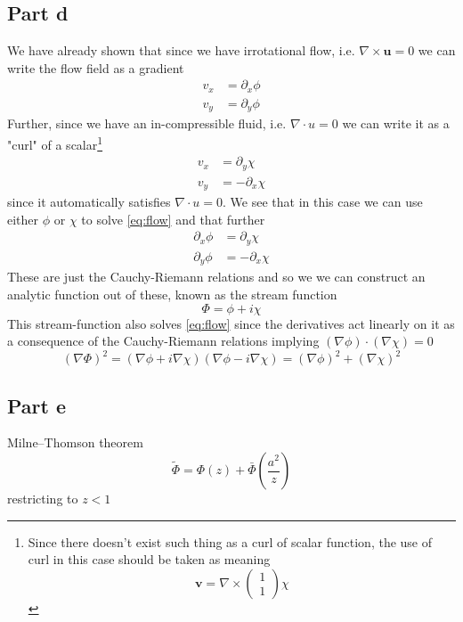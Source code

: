 \documentclass[a4paper,12pt]{article}
\begin{document}
\subsection*{Part d}
We have already shown that since we have irrotational flow, i.e. $\nabla\times \bm u=0$ we can write the flow field as a gradient
\begin{equation}
\begin{aligned}
	v_x&=\partial_x \phi\\
	v_y&=\partial_y \phi
\end{aligned}
\end{equation}
Further, since we have an in-compressible fluid, i.e. $\nabla\cdot u=0$ we can write it as a "curl" of a scalar\footnote{Since there doesn't exist such thing as a curl of scalar function, the use of curl in this case should be taken as meaning \begin{equation}
\bm v=\nabla\times \begin{pmatrix}
1\\1
\end{pmatrix}\chi
\end{equation}}
\begin{equation}
\begin{aligned}
v_x&=\partial_y \chi\\
v_y&=-\partial_x \chi
\end{aligned}
\end{equation}
since it automatically satisfies $\nabla\cdot u=0$. We see that in this case we can use either $\phi$ or $\chi$ to solve \eqref{eq:flow} and that further
\begin{equation}
	\begin{aligned}
		\partial_x \phi&=\partial_y \chi\\
		\partial_y \phi&=-\partial_x \chi
	\end{aligned}
\end{equation}
These are just the Cauchy-Riemann relations and so we we can construct an analytic function out of these, known as the stream function
\begin{equation}
\Phi=\phi+i\chi
\end{equation}
This stream-function also solves \eqref{eq:flow} since the derivatives act linearly on it as a consequence of the Cauchy-Riemann relations implying $(\nabla\phi)\cdot (\nabla\chi)=0$
\begin{equation}
(\nabla \Phi)^2=(\nabla \phi+i\nabla\chi)(\nabla \phi-i\nabla\chi)=(\nabla\phi)^2+(\nabla\chi)^2
\end{equation}
\subsection{Part e}
Milne–Thomson theorem
\begin{equation}
\tilde \Phi= \Phi(z)+\bar \Phi(\frac{a^2}{z})
\end{equation}
restricting to $z<1$
\end{document}
